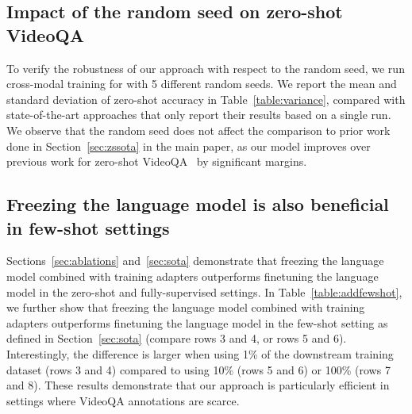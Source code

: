 \subsection{Impact of the random seed on zero-shot VideoQA}\label{sec:seed}
To verify the robustness of our approach with respect to the random seed, we run cross-modal training for \model{} with 5 different random seeds.
We report the mean and standard deviation of zero-shot accuracy in Table~\ref{table:variance}, compared with state-of-the-art approaches that only report their results based on a single run.
We observe that the random seed does not affect the comparison to prior work done in Section~\ref{sec:zssota} in the main paper, as our model improves over previous work for zero-shot VideoQA~\cite{radford2021learning, Yang2022LearningTA, zellers2022merlot} by significant margins.

\subsection{Freezing the language model is also beneficial in few-shot settings}\label{sec:addfewshot}
Sections~\ref{sec:ablations} and~\ref{sec:sota} demonstrate that freezing the language model combined with training adapters outperforms finetuning the language model in the zero-shot and fully-supervised settings.
In Table~\ref{table:addfewshot}, we further show that freezing the language model combined with training adapters outperforms finetuning the language model in the few-shot setting as defined in Section~\ref{sec:sota} (compare rows 3 and 4, or rows 5 and 6).
Interestingly, the difference is larger when using 1\% of the downstream training dataset (rows 3 and 4) compared to using 10\% (rows 5 and 6) or 100\% (rows 7 and 8).
These results demonstrate that our approach is particularly efficient in settings where VideoQA annotations are scarce. 

\begin{table}[t]
\begin{center}
\setlength\tabcolsep{6pt}
\vspace{+0.2cm}
\caption{\small Impact of the inference strategy on the zero-shot open-ended VideoQA performance.}
\label{table:multitoken}
\end{center}
\end{table}


